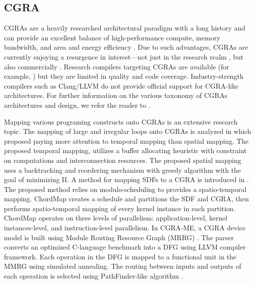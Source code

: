 \subsection{CGRA}
CGRAs are a heavily researched architectural paradigm with a long history and can provide an excellent balance of high-performance compute, memory bandwidth, and area and energy efficiency \cite{theodoridis2007survey}.
Due to such advantages, CGRAs are currently enjoying a resurgence in interest—not just in the research realm \cite{prabhakar2018plasticine}, but also commercially \cite{morgan2018intel, nicol2017coarse, vissers2019versal}.
Research compilers targeting CGRAs are available (for example, \cite{adriaansen2016code, chin_cgra-me_2017, mei2003exploiting, prabhakar2018plasticine}) but they are limited in quality and code coverage. 
Industry-strength compilers such as Clang/LLVM do not provide official support for CGRA-like architectures.
For further information on the various taxonomy of CGRAs architectures and design, we refer the reader to \cite{liu_survey_2019, tehre_survey_2012}.

Mapping various programing constructs onto CGRAs is an extensive research topic.
The  mapping of large and irregular loops onto CGRAs is analyzed in \cite{zhao_towards_2020} which proposed paying more attention to temporal mapping than spatial mapping. 
The proposed temporal mapping, utilizes a buffer allocating heuristic with constraint on computations and interconnection resources. 
The proposed spatial mapping uses a backtracking and reordering mechanism with greedy algorithm with the goal of minimizing II.
A method for mapping SDFs to a CGRA is introduced in \cite{li_chordmap_2022}.
The proposed method relies on modulo-scheduling to provides a spatio-temporal mapping.
ChordMap creates a schedule and partitions the SDF and CGRA, then performs spatio-temporal mapping of every kernel instance in each partition.
ChordMap operates on three levels of parallelism: application-level, kernel instances-level, and instruction-level parallelism.
In CGRA-ME\cite{chin_cgra-me_2017}, a CGRA device model is built using Module Routing Resource Graph (MRRG) \cite{mrrg}. 
The parser converts an optimized C-language benchmark into a DFG using LLVM compiler framework. 
Each operation in the DFG is mapped to a functional unit in the MMRG using simulated annealing. 
The routing between inputs and outputs of each operation is selected using PathFinder-like algorithm \cite{pathfinder}.

